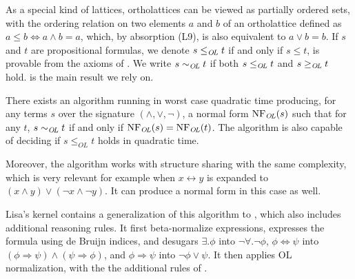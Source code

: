 As a special kind of lattices, ortholattices can be viewed as partially ordered sets, with the ordering relation on two elements $a$ and $b$ of an ortholattice defined as
\(
  a\leq b \iff a \land b = a
\), which, by absorption (L9), is also equivalent to $a \lor b = b$. If $s$ and $t$ are propositional formulas, we denote $s \leq_{\mathit{O{\kern-0.1em}L}} t $ if and only if $s \leq t$, is provable from the axioms of .
We write $s\sim_{\mathit{O{\kern-0.1em}L}} t$ if both $s\leq_{\mathit{O{\kern-0.1em}L}} t$ and $s\geq_{\mathit{O{\kern-0.1em}L}} t$ hold.
 is the main result we rely on.

\begin{theorem}
  \label{thm:OL}
  There exists an algorithm running in worst case quadratic time producing, for any terms $s$ over the signature $(\land, \lor, \neg)$, a normal form $\text{NF}_{\mathit{O{\kern-0.1em}L}}(s)$
  such that for any $t$, $s \sim_{\mathit{O{\kern-0.1em}L}} t$ if and only if $\text{NF}_{\mathit{O{\kern-0.1em}L}}(s) = \text{NF}_{\mathit{O{\kern-0.1em}L}}(t)$. The algorithm is also capable of deciding if $s \leq_{OL} t$ holds in quadratic time.
\end{theorem}
Moreover, the algorithm works with structure sharing with the same complexity, which is very relevant for example when $x \leftrightarrow y$ is expanded to $(x \land y) \lor (\neg x \land \neg y)$. It can produce a normal form in this case as well.

Lisa's kernel contains a generalization of this algorithm to \lambdafol, which also includes additional reasoning rules. It first beta-normalize expressions, expresses the formula using de Bruijn indices, and desugars $\exists. \phi$ into $\neg \forall. \neg \phi$, $\phi\Leftrightarrow\psi$ into $(\phi\Rightarrow\psi)\land(\psi\Rightarrow\phi)$, and $\phi\Rightarrow\psi$ into $\neg \phi \lor \psi$. It then applies OL normalization,  with the the additional rules of .

